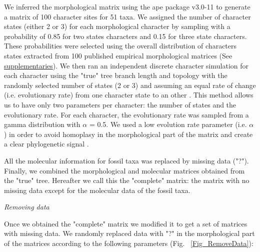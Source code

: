 \documentclass[12pt,letterpaper]{article}
\renewcommand{\subsection}[1]{%
\bigskip
\begin{center}
\begin{large}
\normalfont\itshape #1
\end{large}
\end{center}}
\begin{document}
We inferred the morphological matrix using the ape package v3.0-11 \citep{paradisape:2004} to generate a matrix of 100 character sites for 51 taxa.
We assigned the number of character states (either 2 or 3) for each morphological character by sampling with a probability of 0.85 for two states characters and 0.15 for three state characters.
These probabilities were selected using the overall distribution of characters states extracted from 100 published empirical morphological matrices (See \hyperref[supplementaries]{supplementaries}).
We then ran an independent discrete character simulation for each character using the "true" tree branch length and topology with the randomly selected number of states (2 or 3) and assuming an equal rate of change (i.e. evolutionary rate) from one character state to an other \citep{Pagel22011994}.
This method allows us to have only two parameters per character: the number of states and the evolutionary rate.
For each character, the evolutionary rate was sampled from a gamma distribution with $\alpha$ = 0.5.
We used a low evolution rate parameter (i.e. $\alpha$) in order to avoid homoplasy in the morphological part of the matrix and create a clear phylogenetic signal \citep{wagner2000,davalosintegrating2014}.

All the molecular information for fossil taxa was replaced by missing data ("?").
Finally, we combined the morphological and molecular matrices obtained from the "true" tree.
Hereafter we call this the "complete" matrix: the matrix with no missing data except for the molecular data of the fossil taxa.


\subsection{Removing data}
Once we obtained the "complete" matrix we modified it to get a set of matrices with missing data. %
We randomly replaced data with "?" in the morphological part of the matrices according to the following parameters (Fig. ~\ref{Fig_RemoveData}):
\end{document}

